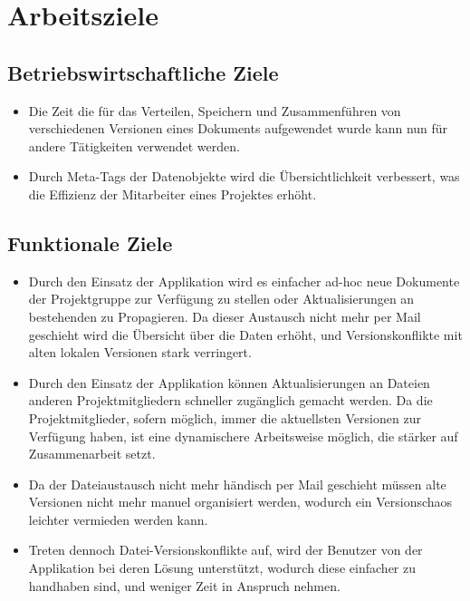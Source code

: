 
\section{Arbeitsziele}

\subsection{Betriebswirtschaftliche Ziele}
\begin{itemize}
\item Die Zeit die für das Verteilen, Speichern und Zusammenführen von verschiedenen Versionen eines Dokuments aufgewendet wurde kann nun für andere Tätigkeiten verwendet werden.
\item Durch Meta-Tags der Datenobjekte wird die Übersichtlichkeit verbessert, was die Effizienz der Mitarbeiter eines Projektes erhöht.
\end{itemize}

\subsection{Funktionale Ziele}
\begin{itemize}
\item Durch den Einsatz der Applikation wird es einfacher ad-hoc neue Dokumente der Projektgruppe zur Verfügung zu stellen oder Aktualisierungen an bestehenden zu Propagieren. Da dieser Austausch nicht mehr per Mail geschieht wird die Übersicht über die Daten erhöht, und Versionskonflikte mit alten lokalen Versionen stark verringert.

\item Durch den Einsatz der Applikation können Aktualisierungen an Dateien anderen Projektmitgliedern schneller zugänglich gemacht werden. Da die Projektmitglieder, sofern möglich, immer die aktuellsten Versionen zur Verfügung haben, ist eine dynamischere Arbeitsweise möglich, die stärker auf Zusammenarbeit setzt.

\item Da der Dateiaustausch nicht mehr händisch per Mail geschieht müssen alte Versionen nicht mehr manuel organisiert werden, wodurch ein Versionschaos leichter vermieden werden kann.

\item Treten dennoch Datei-Versionskonflikte auf, wird der Benutzer von der Applikation bei deren Lösung unterstützt, wodurch diese einfacher zu handhaben sind, und weniger Zeit in Anspruch nehmen.

\end{itemize}

